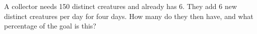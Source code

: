 A collector needs 150 distinct creatures and already has 6. They add 6 new distinct creatures per day for four days. How many do they then have, and what percentage of the goal is this?

